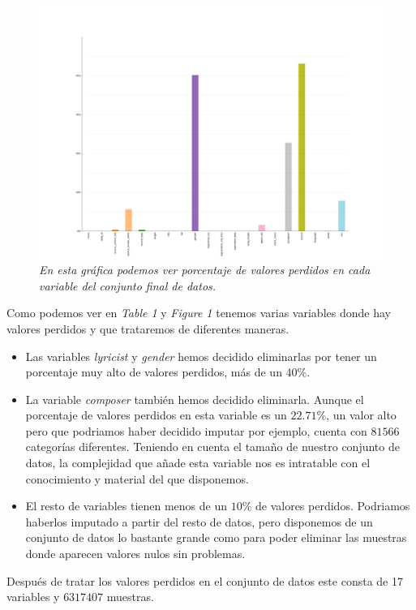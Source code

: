 \documentclass[a4paper]{article}
\begin{document}
\begin{figure}[H]
\centering
\includegraphics[width=1\textwidth]{Images/lost_values_percent.png}
\caption{\textit{En esta gráfica podemos ver porcentaje de valores perdidos en cada variable del conjunto final de datos.}}
\end{figure}

Como podemos ver en \textit{Table 1} y \textit{Figure 1} tenemos varias variables donde hay valores perdidos y que trataremos de diferentes maneras.\\

\begin{itemize}
\item Las variables \textit{lyricist} y \textit{gender} hemos decidido eliminarlas por tener un porcentaje muy alto de valores perdidos, más de un $40\%$. 
\item La variable \textit{composer} también hemos decidido eliminarla. Aunque el porcentaje de valores perdidos en esta variable es un $22.71\%$, un valor alto pero que podriamos haber decidido imputar por ejemplo, cuenta con $81566$ categorías diferentes. Teniendo en cuenta el tamaño de nuestro conjunto de datos, la complejidad que añade esta variable nos es intratable con el conocimiento y material del que disponemos.
\item El resto de variables tienen menos de un $10\%$ de valores perdidos. Podriamos haberlos imputado a partir del resto de datos, pero disponemos de un conjunto de datos lo bastante grande como para poder eliminar las muestras donde aparecen valores nulos sin problemas.
\end{itemize}
Después de tratar los valores perdidos en el conjunto de datos este consta de 17 variables y $6317407$ muestras.
\end{document}
